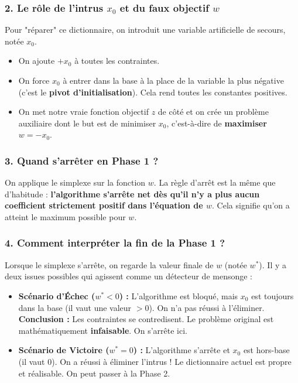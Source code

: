 \documentclass[12pt,a4paper]{article}
\begin{document}
\subsubsection*{2. Le rôle de l'intrus $x_0$ et du faux objectif $w$}
Pour "réparer" ce dictionnaire, on introduit une variable artificielle de secours, notée $x_0$. 
\begin{itemize}
    \item On ajoute $+x_0$ à toutes les contraintes.
    \item On force $x_0$ à entrer dans la base à la place de la variable la plus négative (c'est le \textbf{pivot d'initialisation}). Cela rend toutes les constantes positives.
    \item On met notre vraie fonction objectif $z$ de côté et on crée un problème auxiliaire dont le but est de minimiser $x_0$, c'est-à-dire de \textbf{maximiser $w = -x_0$}.
\end{itemize}

\subsubsection*{3. Quand s'arrêter en Phase 1 ?}
On applique le simplexe sur la fonction $w$. La règle d'arrêt est la même que d'habitude : \textbf{l'algorithme s'arrête net dès qu'il n'y a plus aucun coefficient strictement positif dans l'équation de $w$}. Cela signifie qu'on a atteint le maximum possible pour $w$.

\subsubsection*{4. Comment interpréter la fin de la Phase 1 ?}
Lorsque le simplexe s'arrête, on regarde la valeur finale de $w$ (notée $w^*$). Il y a deux issues possibles qui agissent comme un détecteur de mensonge :

\begin{itemize}
    \item \textbf{Scénario d'Échec ($w^* < 0$) :} L'algorithme est bloqué, mais $x_0$ est toujours dans la base (il vaut une valeur $>0$). On n'a pas réussi à l'éliminer. 
    \textbf{Conclusion :} Les contraintes se contredisent. Le problème original est mathématiquement \textbf{infaisable}. On s'arrête ici.
    
    \item \textbf{Scénario de Victoire ($w^* = 0$) :} L'algorithme s'arrête et $x_0$ est hors-base (il vaut $0$). On a réussi à éliminer l'intrus ! Le dictionnaire actuel est propre et réalisable. On peut passer à la Phase 2.
\end{itemize}
\end{document}
